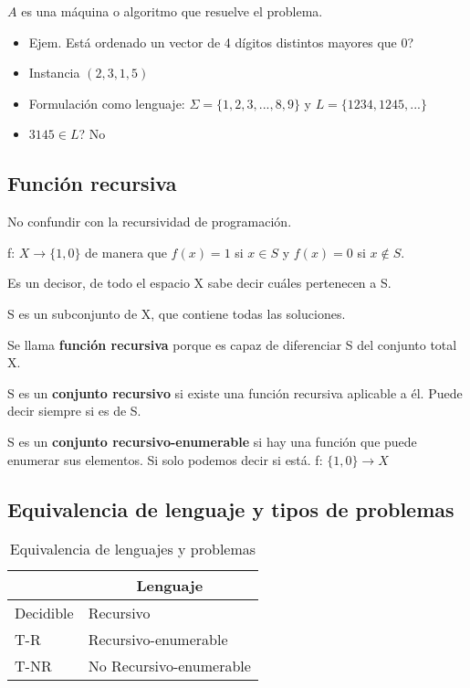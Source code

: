 $A$ es una máquina o algoritmo que resuelve el problema.

\begin{itemize}
    \item Ejem. Está ordenado un vector de 4 dígitos distintos mayores que 0?
    \item Instancia $(2, 3, 1, 5)$
    \item Formulación como lenguaje: $\Sigma = \{1,2,3,...,8,9\}$ y $L=\{1234,1245,...\}$
    \item $3145 \in L$? No
\end{itemize}

\subsection{Función recursiva}
No confundir con la recursividad de programación.

f: $X \rightarrow \{1,0\}$ de manera que $f(x) = 1$ si $x \in S$ y $f(x) = 0$ si $x \notin S$.

Es un decisor, de todo el espacio X sabe decir cuáles pertenecen a S.

S es un subconjunto de X, que contiene todas las soluciones.

Se llama \textbf{función recursiva} porque es capaz de diferenciar S del conjunto total X.

S es un \textbf{conjunto recursivo} si existe una función recursiva aplicable a él. Puede decir siempre si es de S.

S es un \textbf{conjunto recursivo-enumerable} si hay una función que puede enumerar sus elementos. Si solo podemos decir si está. f: $\{1,0\}\rightarrow X$

\subsection{Equivalencia de lenguaje y tipos de problemas}
\begin{table}[H]
    \begin{tabular}{|l|l|}
    \hline
    \rowcolor[HTML]{BFBFBF} 
    \multicolumn{1}{|c|}{\cellcolor[HTML]{BFBFBF}Problema} & \multicolumn{1}{c|}{\cellcolor[HTML]{BFBFBF}Lenguaje} \\ \hline
    Decidible                                              & Recursivo                                             \\ \hline
    T-R                                                    & Recursivo-enumerable                                  \\ \hline
    T-NR                                                   & No Recursivo-enumerable                               \\ \hline
    \end{tabular}
    \caption{Equivalencia de lenguajes y problemas}
\end{table}

